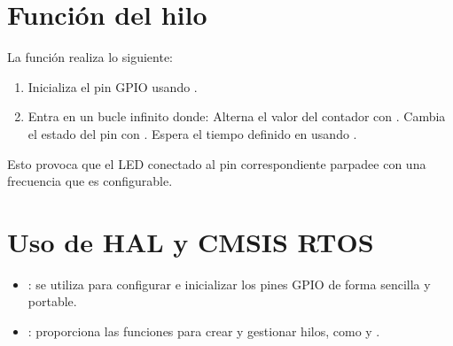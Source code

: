 \documentclass[letterpaper,10pt,english]{sphinxmanual}
\begin{document}
\section{Función del hilo}
\label{\detokenize{ejemplothread:funcion-del-hilo}}
\sphinxAtStartPar
La función  realiza lo siguiente:
\begin{enumerate}
%
\item {} 
\sphinxAtStartPar
Inicializa el pin GPIO usando .

\item {} 
\sphinxAtStartPar
Entra en un bucle infinito donde:
\sphinxhyphen{} Alterna el valor del contador con .
\sphinxhyphen{} Cambia el estado del pin con .
\sphinxhyphen{} Espera el tiempo definido en  usando .

\end{enumerate}

\sphinxAtStartPar
Esto provoca que el LED conectado al pin correspondiente parpadee con una frecuencia que es configurable.


\section{Uso de HAL y CMSIS RTOS}
\label{\detokenize{ejemplothread:uso-de-hal-y-cmsis-rtos}}\begin{itemize}
\item {} 
\sphinxAtStartPar
{}: se utiliza para configurar e inicializar los pines GPIO de forma sencilla y portable.

\item {} 
\sphinxAtStartPar
{}: proporciona las funciones para crear y gestionar hilos, como  y .

\end{itemize}
\end{document}
